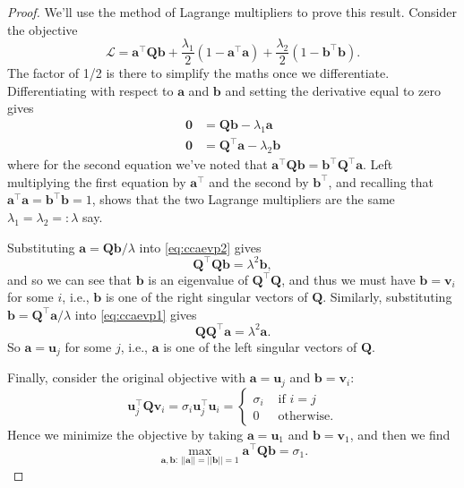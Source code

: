 \documentclass[]{book}
\theoremstyle{definition}
\theoremstyle{definition}
\theoremstyle{definition}
\theoremstyle{remark}
\begin{document}
\begin{proof}
{}We'll use the method of Lagrange multipliers to prove this result. Consider the objective
\[\mathcal{L} = \mathbf a^\top \mathbf Q\mathbf b+\frac{\lambda_1}{2}(1-\mathbf a^\top\mathbf a)+\frac{\lambda_2}{2} (1-\mathbf b^\top \mathbf b).\]
The factor of 1/2 is there to simplify the maths once we differentiate.
Differentiating with respect to \(\mathbf a\) and \(\mathbf b\) and setting the derivative equal to zero gives
\begin{align}
\boldsymbol 0&= \mathbf Q\mathbf b-\lambda_1 \mathbf a\label{eq:ccaevp1}\\
\boldsymbol 0&= \mathbf Q^\top\mathbf a-\lambda_2 \mathbf b\label{eq:ccaevp2}
\end{align}
where for the second equation we've noted that \(\mathbf a^\top \mathbf Q\mathbf b= \mathbf b^\top \mathbf Q^\top \mathbf a\).
Left multiplying the first equation by \(\mathbf a^\top\) and the second by \(\mathbf b^\top\), and recalling that \(\mathbf a^\top \mathbf a=\mathbf b^\top\mathbf b=1\), shows that the two Lagrange multipliers are the same \(\lambda_1 = \lambda_2 =: \lambda\) say.

Substituting \(\mathbf a=\mathbf Q\mathbf b/\lambda\) into \eqref{eq:ccaevp2} gives
\[\mathbf Q^\top\mathbf Q\mathbf b= \lambda^2\mathbf b,\]
and so we can see that \(\mathbf b\) is an eigenvalue of \(\mathbf Q^\top \mathbf Q\), and thus we must have \(\mathbf b= \mathbf v_i\) for some \(i\), i.e., \(\mathbf b\) is one of the right singular vectors of \(\mathbf Q\). Similarly, substituting \(\mathbf b= \mathbf Q^\top \mathbf a/\lambda\) into \eqref{eq:ccaevp1} gives
\[\mathbf Q\mathbf Q^\top \mathbf a= \lambda^2\mathbf a.\]
So \(\mathbf a=\mathbf u_j\) for some \(j\), i.e., \(\mathbf a\) is one of the left singular vectors of \(\mathbf Q\).

Finally, consider the original objective with \(\mathbf a=\mathbf u_j\) and \(\mathbf b=\mathbf v_i\):
\[\mathbf u_j^\top\mathbf Q\mathbf v_i = \sigma_i\mathbf u_j^\top \mathbf u_i = \begin{cases} \sigma_i &\mbox{ if } i = j\\
0 &\mbox{ otherwise.}
\end{cases}
\]
Hence we minimize the objective by taking \(\mathbf a=\mathbf u_1\) and \(\mathbf b=\mathbf v_1\), and then we find
\[\max_{\mathbf a, \mathbf b:\, \vert \vert \mathbf a\vert \vert=\vert \vert \mathbf b\vert \vert =1} \mathbf a^\top \mathbf Q\mathbf b=\sigma_1.\]
\end{proof}
\end{document}
